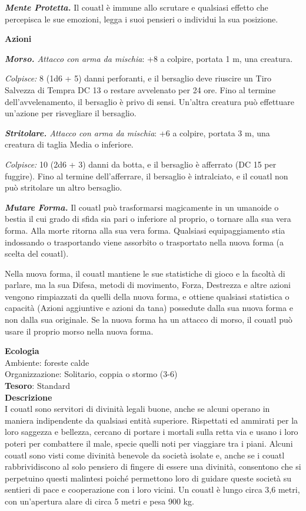 \begin{multicols}{2}
	\textit{\textbf{Mente Protetta.}} Il couatl è immune allo scrutare e qualsiasi effetto che percepisca le sue emozioni, legga i suoi pensieri o individui la sua posizione.

	\textbf{Azioni}

	\textit{\textbf{Morso.} Attacco con arma da mischia}: +8 a colpire, portata 1 m, una creatura.

	\textit{Colpisce:} 8 (1d6 + 5) danni perforanti, e il bersaglio deve riuscire un Tiro Salvezza di Tempra DC 13 o restare avvelenato per 24 ore. Fino al termine dell'avvelenamento, il bersaglio è privo di sensi. Un'altra creatura può effettuare un'azione per risvegliare il bersaglio.

	\textit{\textbf{Stritolare.} Attacco con arma da mischia}: +6 a colpire, portata 3 m, una creatura di taglia Media o inferiore.

	\textit{Colpisce:} 10 (2d6 + 3) danni da botta, e il bersaglio è afferrato (DC 15 per fuggire). Fino al termine dell'afferrare, il bersaglio è intralciato, e il couatl non può stritolare un altro bersaglio.

	\textit{\textbf{Mutare Forma.}} Il couatl può trasformarsi magicamente in un umanoide o bestia il cui grado di sfida sia pari o inferiore al proprio, o tornare alla sua vera forma. Alla morte ritorna alla sua vera forma. Qualsiasi equipaggiamento stia indossando o trasportando viene assorbito o trasportato nella nuova forma (a scelta del couatl).

	Nella nuova forma, il couatl mantiene le sue statistiche di gioco e la facoltà di parlare, ma la sua Difesa, metodi di movimento, Forza, Destrezza e altre azioni vengono rimpiazzati da quelli della nuova forma, e ottiene qualsiasi statistica o capacità (Azioni aggiuntive e azioni da tana) possedute dalla sua nuova forma e non dalla sua originale. Se la nuova forma ha un attacco di morso, il couatl può usare il proprio morso nella nuova forma.

	\textbf{Ecologia}\\
	Ambiente: foreste calde\\
	Organizzazione: Solitario, coppia o stormo (3-6)\\
	\textbf{Tesoro}: Standard\\
	\textbf{Descrizione}\\
	I couatl sono servitori di divinità legali buone, anche se alcuni operano in maniera indipendente da qualsiasi entità superiore. Rispettati ed ammirati per la loro saggezza e bellezza, cercano di portare i mortali sulla retta via e usano i loro poteri per combattere il male, specie quelli noti per viaggiare tra i piani. Alcuni couatl sono visti come divinità benevole da società isolate e, anche se i couatl rabbrividiscono al solo pensiero di fingere di essere una divinità, consentono che si perpetuino questi malintesi poiché permettono loro di guidare queste società su sentieri di pace e cooperazione con i loro vicini. Un couatl è lungo circa 3,6 metri, con un'apertura alare di circa 5 metri e pesa 900 kg.


\end{multicols}
